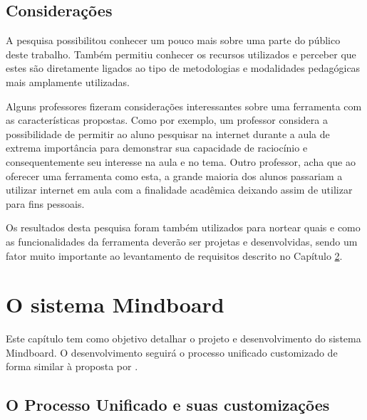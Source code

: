 


\section{Considerações}

A pesquisa possibilitou conhecer um pouco mais sobre uma parte do público deste trabalho. Também permitiu conhecer os recursos utilizados e perceber que estes são diretamente ligados ao tipo de metodologias e modalidades pedagógicas mais amplamente utilizadas.

Alguns professores fizeram considerações interessantes sobre uma ferramenta com as características propostas. Como por exemplo, um professor considera a possibilidade de permitir ao aluno pesquisar na internet durante a aula de extrema importância para demonstrar sua capacidade de raciocínio e consequentemente seu interesse na aula e no tema. Outro professor, acha que ao oferecer uma ferramenta como esta, a grande maioria dos alunos passariam a utilizar internet em aula com a finalidade acadêmica deixando assim de utilizar para fins pessoais.

Os resultados desta pesquisa foram também utilizados para nortear quais e como as funcionalidades da ferramenta deverão ser projetas e desenvolvidas, sendo um fator muito importante ao levantamento de requisitos descrito no Capítulo \ref{cap:mindboard}.


\chapter{O sistema Mindboard}
\label{cap:mindboard}

Este capítulo tem como objetivo detalhar o projeto e desenvolvimento do sistema Mindboard. O desenvolvimento seguirá o processo unificado customizado de forma similar à proposta por .

\section{O Processo Unificado e suas customizações}

